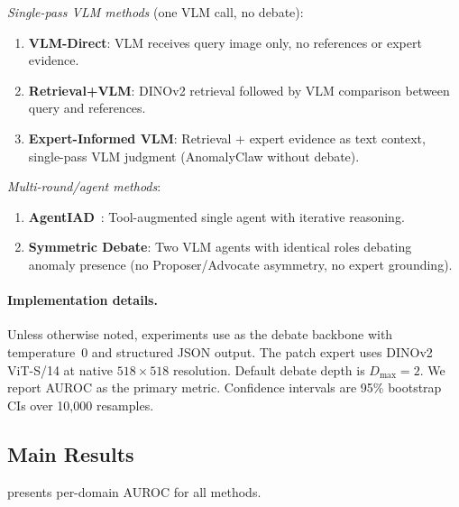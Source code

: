 \emph{Single-pass VLM methods} (one VLM call, no debate):
\begin{enumerate}[leftmargin=*,itemsep=1pt,start=4]
    \item \textbf{VLM-Direct}: VLM receives query image only, no references or expert evidence.
    \item \textbf{Retrieval+VLM}: DINOv2 retrieval followed by VLM comparison between query and references.
    \item \textbf{Expert-Informed VLM}: Retrieval + expert evidence as text context, single-pass VLM judgment (AnomalyClaw without debate).
\end{enumerate}

\emph{Multi-round/agent methods}:
\begin{enumerate}[leftmargin=*,itemsep=1pt,start=7]
    \item \textbf{AgentIAD}~\citep{zhang2025agentiad}: Tool-augmented single agent with iterative reasoning.
    \item \textbf{Symmetric Debate}: Two VLM agents with identical roles debating anomaly presence (no Proposer/Advocate asymmetry, no expert grounding).
\end{enumerate}

\paragraph{Implementation details.}
Unless otherwise noted, experiments use  as the debate backbone with temperature~0 and structured JSON output.
The patch expert uses DINOv2 ViT-S/14 at native $518{\times}518$ resolution.
Default debate depth is $D_{\max}=2$.
We report AUROC as the primary metric.
Confidence intervals are 95\% bootstrap CIs over 10{,}000 resamples.


\subsection{Main Results}
\label{sec:main_results}

 presents per-domain AUROC for all methods.

